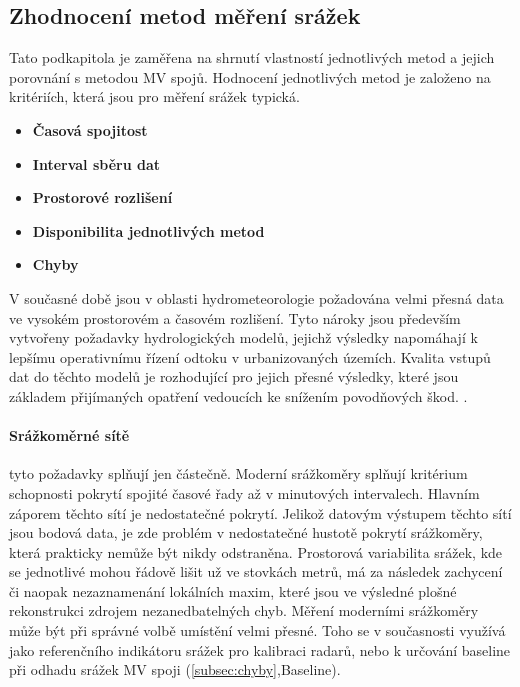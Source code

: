 \documentclass[a4paper,12pt]{article}
\begin{document}
\subsection{Zhodnocení metod měření srážek}
Tato podkapitola je zaměřena na shrnutí vlastností jednotlivých metod a jejich porovnání s metodou MV spojů. Hodnocení jednotlivých metod je založeno na kritériích, která jsou pro měření srážek typická.
\begin{itemize}
\item\textbf{Časová spojitost}
\item\textbf{Interval sběru dat}  
\item\textbf{Prostorové rozlišení}
\item\textbf{Disponibilita jednotlivých metod}
\item\textbf{Chyby}
\end{itemize}
V současné době jsou v oblasti hydrometeorologie požadována velmi přesná data ve vysokém prostorovém a časovém rozlišení. Tyto nároky jsou především vytvořeny požadavky hydrologických modelů, jejichž výsledky napomáhají k lepšímu operativnímu řízení odtoku v urbanizovaných územích. Kvalita vstupů dat do těchto modelů je rozhodující pro jejich přesné výsledky, které jsou základem přijímaných opatření vedoucích ke snížením povodňových škod. .

\paragraph*{Srážkoměrné sítě} 
tyto požadavky splňují jen částečně. Moderní srážkoměry splňují kritérium schopnosti pokrytí spojité časové řady až v minutových intervalech. Hlavním záporem těchto sítí je nedostatečné pokrytí. Jelikož datovým výstupem těchto sítí jsou bodová data, je zde problém v nedostatečné hustotě pokrytí srážkoměry, která prakticky nemůže být nikdy odstraněna. Prostorová variabilita srážek, kde se jednotlivé mohou řádově lišit už ve stovkách metrů, má za následek zachycení či naopak nezaznamenání lokálních maxim, které jsou ve výsledné plošné rekonstrukci zdrojem nezanedbatelných chyb. Měření moderními srážkoměry může být při správné volbě umístění velmi přesné. Toho se v současnosti využívá jako referenčního indikátoru srážek pro kalibraci radarů, nebo k určování baseline při odhadu srážek MV spoji (\ref{subsec:chyby},Baseline).
\end{document}
